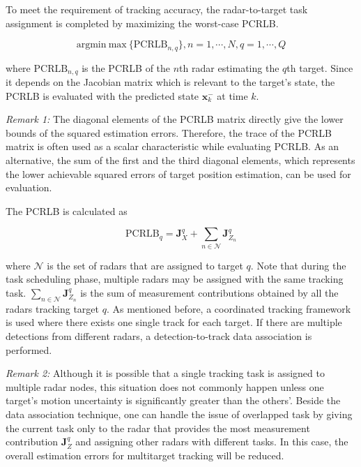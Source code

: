 \documentclass[12pt,journal,draftclsnofoot,onecolumn]{IEEEtran}
\begin{document}
To meet the requirement of tracking accuracy, the radar-to-target task assignment is completed by maximizing the worst-case PCRLB.

\begin{equation}
	\text{argmin}~\text{max}~ \{\text{PCRLB}_{n,q}\}, n=1,\cdots,N, q=1,\cdots,Q
\end{equation}

where $\text{PCRLB}_{n,q}$ is the PCRLB of the $n$th radar estimating the $q$th target. Since it depends on the Jacobian matrix which is relevant to the target's state, the PCRLB is evaluated with the predicted state $\mathbf{x}_k^-$ at time $k$. 

\emph{Remark 1:} The diagonal elements of the PCRLB matrix directly give the lower bounds of the squared estimation errors. Therefore, the trace of the PCRLB matrix is often used as a scalar characteristic while evaluating PCRLB. As an alternative, the sum of the first and the third diagonal elements, which represents the lower achievable squared errors of target position estimation, can be used for evaluation.

The PCRLB is calculated as 

\begin{equation}
	\text{PCRLB}_q = \mathbf{J}_X^q + \sum_{n\in \mathcal{N}}\mathbf{J}_{Z_n}^q
\end{equation}

where $\mathcal{N}$ is the set of radars that are assigned to target $q$. Note that during the task scheduling phase, multiple radars may be assigned with the same tracking task. $\sum_{n\in\mathcal{N}}\mathbf{J}_{Z_n}^q$ is the sum of measurement contributions obtained by all the radars tracking target $q$. As mentioned before, a coordinated tracking framework is used where there exists one single track for each target. If there are multiple detections from different radars, a detection-to-track data association is performed.

\emph{Remark 2:} Although it is possible that a single tracking task is assigned to multiple radar nodes, this situation does not commonly happen unless one target's motion uncertainty is significantly greater than the others'. Beside the data association technique, one can handle the issue of overlapped task by giving the current task only to the radar that provides the most measurement contribution $\mathbf{J}_Z^q$ and assigning other radars with different tasks. In this case, the overall estimation errors for multitarget tracking will be reduced.
\end{document}
